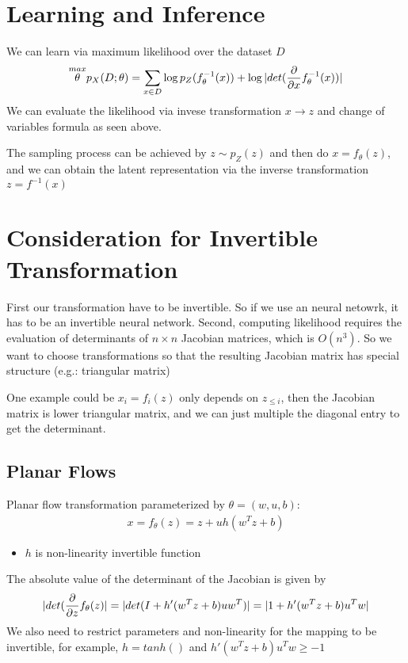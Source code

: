 \section{Learning and Inference} 
We can learn via maximum likelihood over the dataset $D$
    \begin{align*}
        \overset{max}{\theta}p_X(D;\theta) = \sum_{x\in D}\log p_Z(f_\theta^{-1}(x)) + \log |det(\frac{\partial}{\partial x}f^{-1}_\theta(x))|
    \end{align*}
We can evaluate the likelihood via invese transformation $x\to z$ and change of variables formula as seen above. \\ \par

The sampling process can be achieved by $z\sim p_Z(z)$ and then do $x = f_\theta(z)$, and we can obtain the latent representation via the inverse transformation $z = f^{-1}(x)$

\section{Consideration for Invertible Transformation} 
First our transformation have to be invertible. So if we use an neural netowrk, it has to be an invertible neural network. Second, computing likelihood requires the evaluation of determinants of $n \times n$ Jacobian matrices, which is $O(n^3)$. So we want to choose transformations so that the resulting Jacobian matrix has special structure (e.g.: triangular matrix)\\ \par

One example could be $x_i = f_i(z)$ only depends on $z_{\leq i}$, then the Jacobian matrix is lower triangular matrix, and we can just multiple the diagonal entry to get the determinant. \\ \par


\subsection{Planar Flows}
Planar flow transformation parameterized by $\theta = (w, u, b)$: 
    \begin{align*}
        x = f_\theta(z) = z + uh(w^Tz + b)
    \end{align*}
    \begin{itemize}
        \item $h$ is non-linearity invertible function 
    \end{itemize}
The absolute value of the determinant of the Jacobian is given by 
    \begin{align*}
        |det(\frac{\partial}{\partial z} f_\theta(z)| = |det(I + h'(w^Tz+b)uw^T)| = |1 + h'(w^Tz+b)u^Tw|
    \end{align*}
We also need to restrict parameters and non-linearity for the mapping to be invertible, for example, $h = tanh()$ and $h'(w^Tz+b)u^Tw \geq -1$


